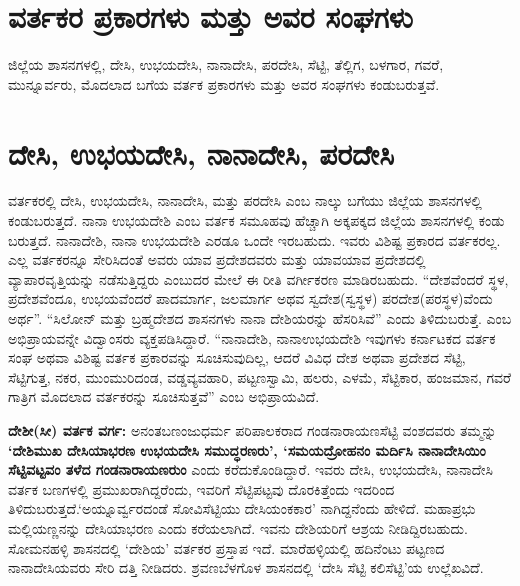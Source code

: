 \section{ವರ್ತಕರ ಪ್ರಕಾರಗಳು ಮತ್ತು ಅವರ ಸಂಘಗಳು}

ಜಿಲ್ಲೆಯ ಶಾಸನಗಳಲ್ಲಿ, ದೇಸಿ, ಉಭಯದೇಸಿ, ನಾನಾದೇಸಿ, ಪರದೇಸಿ, ಸೆಟ್ಟಿ, ತೆಲ್ಲಿಗ, ಬಳಗಾರ, ಗವರೆ, ಮುನ್ನೂರ್ವರು, ಮೊದಲಾದ ಬಗೆಯ ವರ್ತಕ ಪ್ರಕಾರಗಳು ಮತ್ತು ಅವರ ಸಂಘಗಳು ಕಂಡುಬರುತ್ತವೆ.


\section{ದೇಸಿ, ಉಭಯದೇಸಿ, ನಾನಾದೇಸಿ, ಪರದೇಸಿ}

ವರ್ತಕರಲ್ಲಿ ದೇಸಿ, ಉಭಯದೇಸಿ, ನಾನಾದೇಸಿ, ಮತ್ತು ಪರದೇಸಿ ಎಂಬ ನಾಲ್ಕು ಬಗೆಯು ಜಿಲ್ಲೆಯ ಶಾಸನಗಳಲ್ಲಿ ಕಂಡುಬರುತ್ತದೆ. ನಾನಾ ಉಭಯದೇಶಿ ಎಂಬ ವರ್ತಕ ಸಮೂಹವು ಹೆಚ್ಚಾಗಿ ಅಕ್ಕಪಕ್ಕದ ಜಿಲ್ಲೆಯ ಶಾಸನಗಳಲ್ಲಿ ಕಂಡು ಬರುತ್ತದೆ. ನಾನಾದೇಶಿ, ನಾನಾ ಉಭಯದೇಶಿ ಎರಡೂ ಒಂದೇ ಇರಬಹುದು. ಇವರು ವಿಶಿಷ್ಟ ಪ್ರಕಾರದ ವರ್ತಕರಲ್ಲ. ಎಲ್ಲ ವರ್ತಕರನ್ನೂ ಸೇರಿಸಿದಂತೆ ಅವರು ಯಾವ ಪ್ರದೇಶದವರು ಮತ್ತು ಯಾವಯಾವ ಪ್ರದೇಶದಲ್ಲಿ ವ್ಯಾಪಾರವೃತ್ತಿಯನ್ನು ನಡೆಸುತ್ತಿದ್ದರು ಎಂಬುದರ ಮೇಲೆ ಈ ರೀತಿ ವರ್ಗೀಕರಣ ಮಾಡಿರಬಹುದು. “ದೇಶವೆಂದರೆ ಸ್ಥಳ, ಪ್ರದೇಶವೆಂದೂ, ಉಭಯವೆಂದರೆ ಪಾದಮಾರ್ಗ, ಜಲಮಾರ್ಗ ಅಥವ ಸ್ವದೇಶ(ಸ್ವಸ್ಥಳ) ಪರದೇಶ(ಪರಸ್ಥಳ)ವೆಂದು ಅರ್ಥ”. “ಸಿಲೋನ್​ ಮತ್ತು ಬ್ರಹ್ಮದೇಶದ ಶಾಸನಗಳು ನಾನಾ ದೇಶಿಯರನ್ನು ಹೆಸರಿಸಿವೆ” ಎಂದು ತಿಳಿದುಬರುತ್ತೆ. ಎಂಬ ಅಭಿಪ್ರಾಯವನ್ನೇ ವಿದ್ವಾಂಸರು ವ್ಯಕ್ತಪಡಿಸಿದ್ದಾರೆ. “ನಾನಾದೇಶಿ, ನಾನಾಉಭಯದೇಶಿ ಇವುಗಳು ಕರ್ನಾಟಕದ ವರ್ತಕ ಸಂಘ ಅಥವಾ ವಿಶಿಷ್ಟ ವರ್ತಕ ಪ್ರಕಾರವನ್ನು ಸೂಚಿಸುವುದಿಲ್ಲ, ಆದರೆ ವಿವಿಧ ದೇಶ ಅಥವಾ ಪ್ರದೇಶದ ಸೆಟ್ಟಿ, ಸೆಟ್ಟಿಗುತ್ತ, ನಕರ, ಮುಂಮುರಿದಂಡ, ವಡ್ಡವ್ಯವಹಾರಿ, ಪಟ್ಟಣಸ್ವಾಮಿ, ಹಲರು, ಎಳಮೆ, ಸೆಟ್ಟಿಕಾರ, ಹಂಜಮಾನ, ಗವರೆ ಗಾತ್ರಿಗ ಮೊದಲಾದ ವರ್ತಕರನ್ನು ಸೂಚಿಸುತ್ತವೆ” ಎಂಬ ಅಭಿಪ್ರಾಯವಿದೆ.

\textbf{ದೇಶೀ(ಸೀ) ವರ್ತಕ ವರ್ಗ:} ಅನಂತಬಣಂಜುಧರ್ಮ ಪರಿಪಾಲಕರಾದ ಗಂಡನಾರಾಯಣಸೆಟ್ಟಿ ವಂಶದವರು ತಮ್ಮನ್ನು \textbf{‘ದೇಶಿಮುಖ ದೇಸಿಯಾಭರಣ ಉಭಯದೇಸಿ ಸಮುದ್ಧರಣರು’, ‘ಸಮಯದ್ರೋಹನಂ ಮರ್ದಿಸಿ ನಾನಾದೇಸಿಯಿಂ ಸೆಟ್ಟಿವಟ್ಟವಂ ತಳೆದ ಗಂಡನಾರಾಯಣರುಂ} ಎಂದು ಕರೆದುಕೊಂಡಿದ್ದಾರೆ. ಇವರು ದೇಸಿ, ಉಭಯದೇಸಿ, ನಾನಾದೇಸಿ ವರ್ತಕ ಬಣಗಳಲ್ಲಿ ಪ್ರಮುಖರಾಗಿದ್ದರೆಂದು, ಇವರಿಗೆ ಸೆಟ್ಟಿಪಟ್ಟವು ದೊರಕಿತ್ತೆಂದು ಇದರಿಂದ ತಿಳಿದುಬರುತ್ತದೆ.\break ‘ಅಯ್ನೂರ್ವ್ವರದಂಡೆ ಸೋವಿಸೆಟ್ಟಿಯು ದೇಸಿಯಂಕಕಾರ’ ನಾಗಿದ್ದನೆಂದು ಹೇಳಿದೆ. ಮಹಾಪ್ರಭು ಮಲ್ಲಿಯಣ್ಣನನ್ನು ದೇಸಿಯಾಭರಣ ಎಂದು ಕರೆಯಲಾಗಿದೆ. ಇವನು ದೇಶಿಯರಿಗೆ ಆಶ್ರಯ ನೀಡಿದ್ದಿರಬಹುದು. ಸೋಮನಹಳ್ಳಿ ಶಾಸನದಲ್ಲಿ ‘ದೇಶಿಯ’ ವರ್ತಕರ ಪ್ರಸ್ತಾಪ ಇದೆ. ಮಾರೆಹಳ್ಳಿಯಲ್ಲಿ ಹದಿನೆಂಟು ಪಟ್ಟಣದ ನಾನಾದೇಸಿಯವರು ಸೇರಿ ದತ್ತಿ ನೀಡಿದರು. ಶ್ರವಣಬೆಳಗೊಳ ಶಾಸನದಲ್ಲಿ ‘ದೇಸಿ ಸೆಟ್ಟಿ ಕಲಿಸೆಟ್ಟಿ’ಯ ಉಲ್ಲೆಖವಿದೆ.

